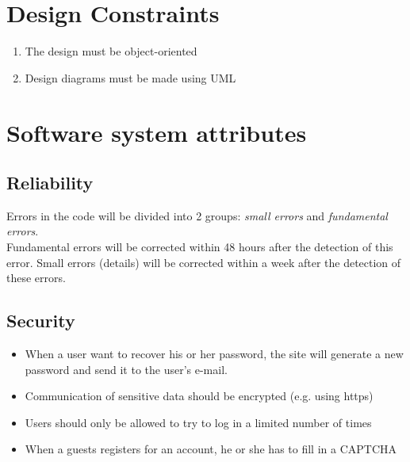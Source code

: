 \section{Design Constraints}
	\begin{enumerate}
		\item The design must be object-oriented
		\item Design diagrams must be made using UML
	\end{enumerate}
\section{Software system attributes}
	\subsection{Reliability}
		Errors in the code will be divided into 2 groups: \textit{small errors} and \textit{fundamental errors}. \\ 
		Fundamental errors will be corrected within 48 hours after the detection of this error. Small errors (details) will be corrected within a week after the detection of these errors. 
	\subsection{Security}
		\begin{itemize}
			\item When a user want to recover his or her password, the site will generate a new password and send it to the user's e-mail.
			\item Communication of sensitive data should be encrypted (e.g. using https)
			\item Users should only be allowed to try to log in a limited number of times
			\item When a guests registers for an account, he or she has to fill in a CAPTCHA
		\end{itemize}
